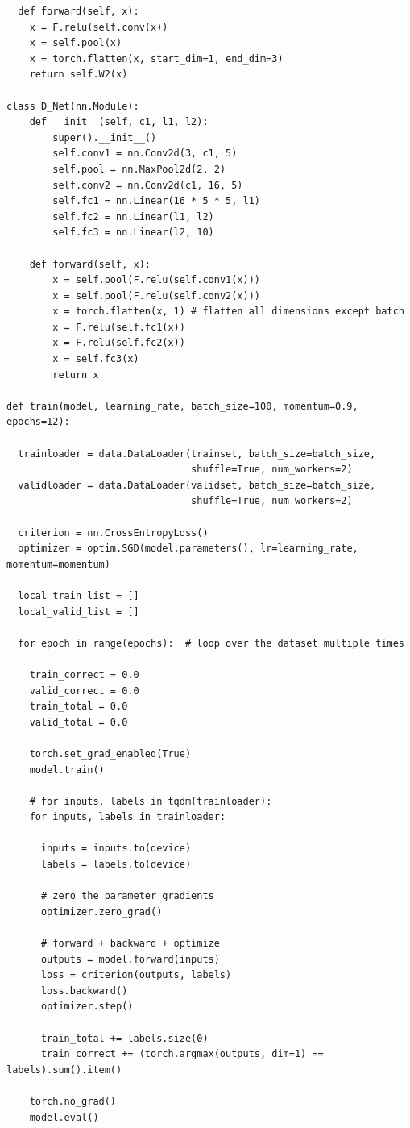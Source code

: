 \documentclass{article}
\newcommand{\1}{\mathbf{1}}
\begin{document}
{\begin{verbatim}
  def forward(self, x):
    x = F.relu(self.conv(x))
    x = self.pool(x)
    x = torch.flatten(x, start_dim=1, end_dim=3)
    return self.W2(x)

class D_Net(nn.Module):
    def __init__(self, c1, l1, l2):
        super().__init__()
        self.conv1 = nn.Conv2d(3, c1, 5)
        self.pool = nn.MaxPool2d(2, 2)
        self.conv2 = nn.Conv2d(c1, 16, 5)
        self.fc1 = nn.Linear(16 * 5 * 5, l1)
        self.fc2 = nn.Linear(l1, l2)
        self.fc3 = nn.Linear(l2, 10)

    def forward(self, x):
        x = self.pool(F.relu(self.conv1(x)))
        x = self.pool(F.relu(self.conv2(x)))
        x = torch.flatten(x, 1) # flatten all dimensions except batch
        x = F.relu(self.fc1(x))
        x = F.relu(self.fc2(x))
        x = self.fc3(x)
        return x

def train(model, learning_rate, batch_size=100, momentum=0.9, epochs=12):

  trainloader = data.DataLoader(trainset, batch_size=batch_size,
                                shuffle=True, num_workers=2)
  validloader = data.DataLoader(validset, batch_size=batch_size,
                                shuffle=True, num_workers=2)

  criterion = nn.CrossEntropyLoss()
  optimizer = optim.SGD(model.parameters(), lr=learning_rate, momentum=momentum)

  local_train_list = []
  local_valid_list = []

  for epoch in range(epochs):  # loop over the dataset multiple times

    train_correct = 0.0
    valid_correct = 0.0
    train_total = 0.0
    valid_total = 0.0

    torch.set_grad_enabled(True)
    model.train()

    # for inputs, labels in tqdm(trainloader):
    for inputs, labels in trainloader:

      inputs = inputs.to(device)
      labels = labels.to(device)

      # zero the parameter gradients
      optimizer.zero_grad()

      # forward + backward + optimize
      outputs = model.forward(inputs)
      loss = criterion(outputs, labels)
      loss.backward()
      optimizer.step()
        
      train_total += labels.size(0)
      train_correct += (torch.argmax(outputs, dim=1) == labels).sum().item()
    
    torch.no_grad()
    model.eval()


\end{verbatim}}
\end{document}
